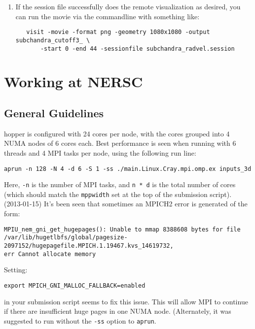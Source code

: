 \begin{itemize}
\begin{enumerate}
  \item If the session file successfully does the remote visualization
   as desired, you can run the movie via the commandline with something like:

   \begin{verbatim}
   visit -movie -format png -geometry 1080x1080 -output subchandra_cutoff3_ \
       -start 0 -end 44 -sessionfile subchandra_radvel.session
   \end{verbatim}

  \end{enumerate}

\end{itemize}


\section{Working at NERSC}

\subsection{General Guidelines}

hopper is configured with 24 cores per node, with the cores grouped
into 4 NUMA nodes of 6 cores each.  Best performance is seen when
running with 6 threads and 4 MPI tasks per node, using the following
run line:
\begin{verbatim}
aprun -n 128 -N 4 -d 6 -S 1 -ss ./main.Linux.Cray.mpi.omp.ex inputs_3d
\end{verbatim}
Here, {\tt -n} is the number of MPI tasks, and {\tt n * d} is the
total number of cores (which should match the {\tt mppwidth} set at
the top of the submission script). \\

\noindent (2013-01-15) It's been seen that sometimes an MPICH2 error is 
generated of the form:
\begin{verbatim}
MPIU_nem_gni_get_hugepages(): Unable to mmap 8388608 bytes for file 
/var/lib/hugetlbfs/global/pagesize-2097152/hugepagefile.MPICH.1.19467.kvs_14619732, 
err Cannot allocate memory
\end{verbatim}
Setting:
\begin{verbatim}
export MPICH_GNI_MALLOC_FALLBACK=enabled
\end{verbatim}
in your submission script seems to fix this issue.  This will allow
MPI to continue if there are insufficient huge pages in one NUMA node.
(Alternately, it was suggested to run without the {\tt -ss} option to
{\tt aprun}.

